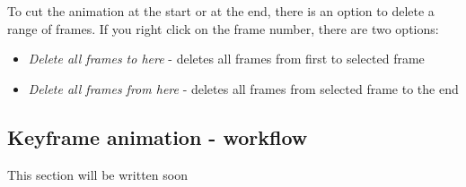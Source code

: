 	To cut the animation at the start or at the end, there is an option to delete a range of frames. If you right click on the frame number, there are two options:
	\begin{itemize}
		\item \emph{Delete all frames to here} - deletes all frames from first to selected frame
		\item \emph{Delete all frames from here} - deletes all frames from selected frame to the end
	\end{itemize}
	
	
	


\subsection{Keyframe animation - workflow}\label{keyframe-animation}

	This section will be written soon
